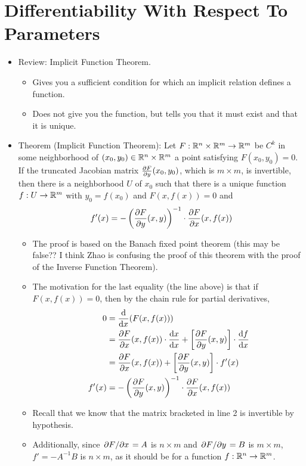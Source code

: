 \documentclass[../notes.tex]{subfiles}
\begin{document}
\section{Differentiability With Respect To Parameters}
\begin{itemize}
    \item {}Review: Implicit Function Theorem.
    \begin{itemize}
        \item Gives you a sufficient condition for which an implicit relation defines a function.
        \item Does not give you the function, but tells you that it must exist and that it is unique.
    \end{itemize}
    \item Theorem (Implicit Function Theorem): Let $F:\mathbb{R}^n\times\mathbb{R}^m\to\mathbb{R}^m$ be $C^k$ in some neighborhood of $(x_0,y_0)\in\mathbb{R}^n\times\mathbb{R}^m$ a point satisfying $F(x_0,y_0)=0$. If the truncated Jacobian matrix ${\pdv{F}{y}}(x_0,y_0)$, which is $m\times m$, is invertible, then there is a neighborhood $U$ of $x_0$ such that there is a unique function $f:U\to\mathbb{R}^m$ with $y_0=f(x_0)$ and $F(x,f(x))=0$ and
    \begin{equation*}
        f'(x) = -\left( {\pdv{F}{y}}(x,y) \right)^{-1}\cdot{\pdv{F}{x}}(x,f(x))
    \end{equation*}
    \begin{itemize}
        \item The proof is based on the Banach fixed point theorem (this may be false?? I think Zhao is confusing the proof of this theorem with the proof of the Inverse Function Theorem).
        \item The motivation for the last equality (the line above) is that if $F(x,f(x))=0$, then by the chain rule for partial derivatives,
        \begin{align*}
            0 &= \dv{x}(F(x,f(x)))\\
            &= {\pdv{F}{x}}(x,f(x))\cdot\dv{x}{x}+\left[ {\pdv{F}{y}}(x,y) \right]\cdot\dv{f}{x}\\
            &= {\pdv{F}{x}}(x,f(x))+\left[ {\pdv{F}{y}}(x,y) \right]\cdot f'(x)\\
            f'(x) &= -\left( {\pdv{F}{y}}(x,y) \right)^{-1}\cdot{\pdv{F}{x}}(x,f(x))
        \end{align*}
        \item Recall that we know that the matrix bracketed in line 2 is invertible by hypothesis.
        \item Additionally, since $\pdv*{F}{x}=A$ is $n\times m$ and $\pdv*{F}{y}=B$ is $m\times m$, $f'=-A^{-1}B$ is $n\times m$, as it should be for a function $f:\mathbb{R}^n\to\mathbb{R}^m$.

\end{itemize}
\end{itemize}
\end{document}
